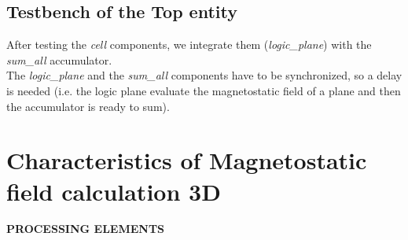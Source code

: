 \subsection{Testbench of the Top entity}
After testing the \textit{cell} components, we integrate them (\textit{logic\_plane}) with the \textit{sum\_all} accumulator.\\
The \textit{logic\_plane} and the \textit{sum\_all} components have to be synchronized, so a delay is needed (i.e. the logic plane evaluate the magnetostatic field of a plane and then the accumulator is ready to sum).
\clearpage
\newpage 
\section{Characteristics of Magnetostatic field calculation 3D}
\vspace{10pt}
{\large \textbf{PROCESSING ELEMENTS}}\vspace{10pt}\\
